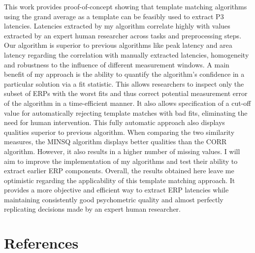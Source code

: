 \documentclass[
  man]{apa7}
\begin{document}
This work provides proof-of-concept showing that template matching algorithms using the grand average as a template can be feasibly used to extract P3 latencies. Latencies extracted by my algorithm correlate highly with values extracted by an expert human researcher across tasks and preprocessing steps. Our algorithm is superior to previous algorithms like peak latency and area latency regarding the correlation with manually extracted latencies, homogeneity and robustness to the influence of different measurement windows. A main benefit of my approach is the ability to quantify the algorithm's confidence in a particular solution via a fit statistic. This allows researchers to inspect only the subset of ERPs with the worst fits and thus correct potential measurement error of the algorithm in a time-efficient manner. It also allows specification of a cut-off value for automatically rejecting template matches with bad fits, eliminating the need for human intervention. This fully automatic approach also displays qualities superior to previous algorithm. When comparing the two similarity measures, the MINSQ algorithm displays better qualities than the CORR algorithm. However, it also results in a higher number of missing values. I will aim to improve the implementation of my algorithms and test their ability to extract earlier ERP components. Overall, the results obtained here leave me optimistic regarding the applicability of this template matching approach. It provides a more objective and efficient way to extract ERP latencies while maintaining consistently good psychometric quality and almost perfectly replicating decisions made by an expert human researcher.

\newpage

\hypertarget{references}{%
\section{References}\label{references}}
\end{document}
